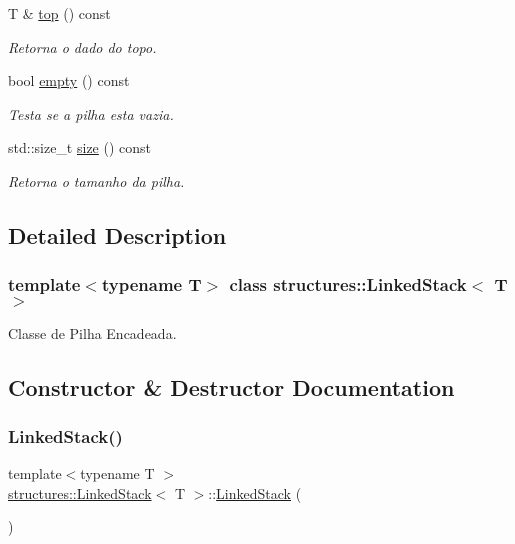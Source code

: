 \begin{DoxyCompactItemize}
T \& \hyperlink{classstructures_1_1LinkedStack_a14ab6e3507dd1206a87bba8c57e1733f}{top} () const
\begin{DoxyCompactList}\small\item\em Retorna o dado do topo. \end{DoxyCompactList}\item 
bool \hyperlink{classstructures_1_1LinkedStack_ac9704fd697f9c4ed4f7fc4e786114e4f}{empty} () const
\begin{DoxyCompactList}\small\item\em Testa se a pilha esta vazia. \end{DoxyCompactList}\item 
std\+::size\+\_\+t \hyperlink{classstructures_1_1LinkedStack_ae1ca6a5a9b837471863f1c8bb23cfe1d}{size} () const
\begin{DoxyCompactList}\small\item\em Retorna o tamanho da pilha. \end{DoxyCompactList}\end{DoxyCompactItemize}


\subsection{Detailed Description}
\subsubsection*{template$<$typename T$>$\newline
class structures\+::\+Linked\+Stack$<$ T $>$}

Classe de Pilha Encadeada. 

\subsection{Constructor \& Destructor Documentation}
\mbox{\label{classstructures_1_1LinkedStack_a546b827cccaa49b4f470110bc3a9004e}} 
\subsubsection{\texorpdfstring{Linked\+Stack()}{LinkedStack()}}
{\footnotesize\ttfamily template$<$typename T $>$ \\
\hyperlink{classstructures_1_1LinkedStack}{structures\+::\+Linked\+Stack}$<$ T $>$\+::\hyperlink{classstructures_1_1LinkedStack}{Linked\+Stack} (\begin{DoxyParamCaption}{ }\end{DoxyParamCaption})}



